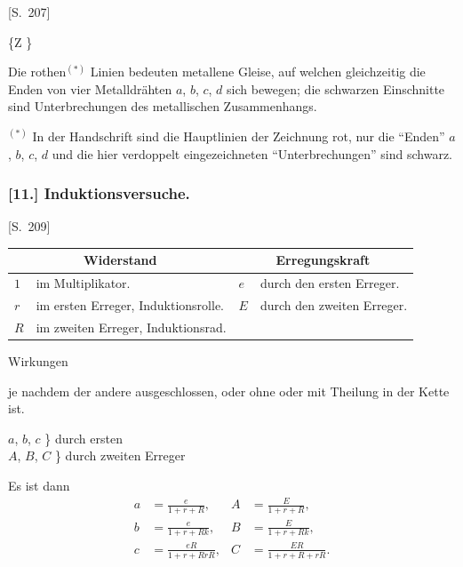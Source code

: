 \documentclass[12pt,a4paper]{article}
\begin{document}
[S.~207]

\begin{center}
\{Z \}
\end{center}

Die rothen$^{(*)}$ Linien bedeuten metallene Gleise, auf welchen gleichzeitig die Enden von vier Metalldr\"ahten $a$, $b$, $c$, $d$ sich bewegen; die schwarzen Einschnitte sind Unterbrechungen des metallischen Zusammenhangs.

\medskip\noindent
$^{(*)}$ In der Handschrift sind die Hauptlinien der Zeichnung rot, nur die ``Enden'' $a$, $b$, $c$, $d$ und die hier verdoppelt eingezeichneten ``Unterbrechungen'' sind schwarz.

\subsubsection*{[11.] Induktionsversuche.}

[S.~209]

\begin{center}
\begin{tabular}{ll|ll}
\multicolumn{2}{c|}{Widerstand} & \multicolumn{2}{c}{Erregungskraft} \\
\hline
$1$ & im Multiplikator. & $e$ & durch den ersten Erreger. \\
$r$ & im ersten Erreger, Induktionsrolle. & $E$ & durch den zweiten Erreger. \\
$R$ & im zweiten Erreger, Induktionsrad. & & \\
\end{tabular}
\end{center}

Wirkungen

je nachdem der andere ausgeschlossen, oder ohne oder mit Theilung in der Kette ist.

\begin{center}
$a$, $b$, $c$ \} durch ersten \\
$A$, $B$, $C$ \} durch zweiten Erreger
\end{center}

Es ist dann
\begin{align*}
a &= \frac{e}{1+r+R}, & A &= \frac{E}{1+r+R}, \\
b &= \frac{e}{1+r+Rk}, & B &= \frac{E}{1+r+Rk}, \\
c &= \frac{eR}{1+r+RrR}, & C &= \frac{ER}{1+r+R+rR}.
\end{align*}
\end{document}
